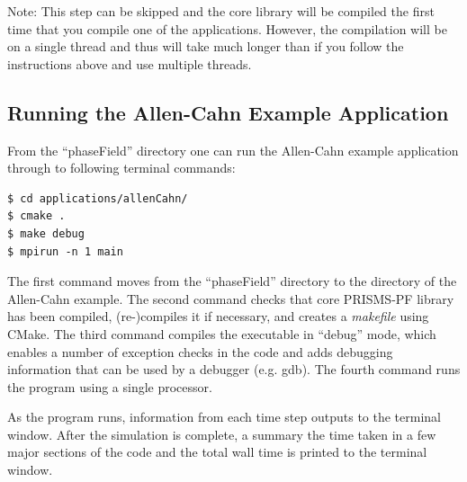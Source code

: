 \documentclass[10pt]{article} %
\begin{document}
Note: This step can be skipped and the core library will be compiled the first time that you compile one of the applications. However, the compilation will be on a single thread and thus will take much longer than if you follow the instructions above and use multiple threads.

\subsection{Running the Allen-Cahn Example Application} \label{allen_cahn_instructions}
From the ``phaseField'' directory one can run the Allen-Cahn example application through to following terminal commands:
\begin{lstlisting}
$ cd applications/allenCahn/ 
$ cmake . 
$ make debug 
$ mpirun -n 1 main 
\end{lstlisting}

The first command moves from the ``phaseField'' directory to the directory of the Allen-Cahn example. The second command checks that core PRISMS-PF library has been compiled, (re-)compiles it if necessary, and creates a \emph{makefile} using CMake. The third command compiles the executable in ``debug'' mode, which enables a number of exception checks in the code and adds debugging information that can be used by a debugger (e.g. gdb). The fourth command runs the program using a single processor.

As the program runs, information from each time step outputs to the terminal window. After the simulation is complete, a summary the time taken in a few major sections of the code and the total wall time is printed to the terminal window. 
\end{document}
